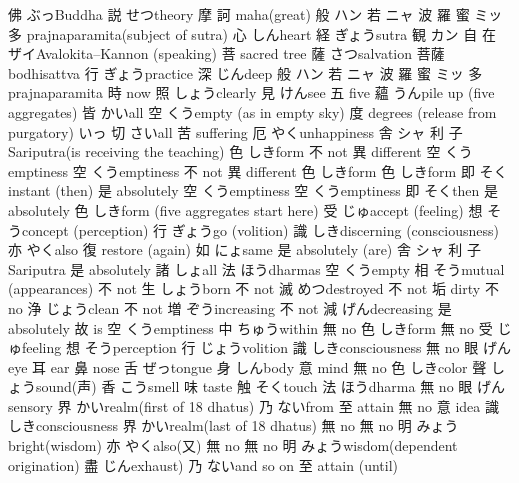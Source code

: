 	
{佛}	{ぶっ}{Buddha}
{説}	{せつ}{theory}
{摩}	{}{}
{訶}	{}{maha(great)}
{般}	{ハン}{}
{若}	{ニャ}{}
{波}	{}{}
{羅}	{}{}
{蜜}	{ミッ}{}
{多}	{}{prajnaparamita(subject of sutra)}
{心}	{しん}{heart}
{経}	{ぎょう}{sutra}
{観}	{カン}{}
{自}	{}{}
{在}	{ザイ}{Avalokita--Kannon (speaking)}
{菩}	{}{sacred tree}
{薩}	{さつ}{salvation 菩薩 bodhisattva}
{行}	{ぎょう}{practice}
{深}	{じん}{deep}
{般}	{ハン}{}
{若}	{ニャ}{}
{波}	{}{}
{羅}	{}{}
{蜜}	{ミッ}{}
{多}	{}{prajnaparamita}
{時}	{}{now}
{照}	{しょう}{clearly}
{見}	{けん}{see}
{五}	{}{five}
{蘊}	{うん}{pile up (five aggregates) }
{皆}	{かい}{all}
{空}	{くう}{empty (as in empty sky)}
{度}	{}{degrees (release from purgatory)}
{\stick}	{いっ}{}
{切}	{さい}{all}
{苦}	{}{suffering}
{厄}	{やく}{unhappiness}
{舎}	{シャ}{}
{利}	{}{}
{子}	{}{Sariputra(is receiving the teaching)}
{色}	{しき}{form}
{不}	{}{not}
{異}	{}{different}
{空}	{くう}{emptiness}
{空}	{くう}{emptiness}
{不}	{}{not}
{異}	{}{different}
{色}	{しき}{form}
{色}	{しき}{form}
{即}	{そく}{instant (then)}
{是}	{}{absolutely}
{空}	{くう}{emptiness}
{空}	{くう}{emptiness}
{即}	{そく}{then}
{是}	{}{absolutely}
{色}	{しき}{form (five aggregates start here)}
{受}	{じゅ}{accept (feeling)}
{想}	{そう}{concept (perception)}
{行}	{ぎょう}{go (volition)}
{識}	{しき}{discerning (consciousness)}
{亦}	{やく}{also}
{復}	{}{restore (again)}
{如}	{にょ}{same}
{是}	{}{absolutely (are)}
{舎}	{シャ}{}
{利}	{}{}
{子}	{}{Sariputra}
{是}	{}{absolutely}
{諸}	{しょ}{all}
{法}	{ほう}{dharmas}
{空}	{くう}{empty}
{相}	{そう}{mutual (appearances)}
{不}	{}{not}
{生}	{しょう}{born}
{不}	{}{not}
{滅}	{めつ}{destroyed}
{不}	{}{not}
{垢}	{}{dirty}
{不}	{}{no}
{浄}	{じょう}{clean}
{不}	{not}
{増}	{ぞう}{increasing}
{不}	{}{not}
{減}	{げん}{decreasing}
{是}	{}{absolutely}
{故}	{}{is}
{空}	{くう}{emptiness}
{中}	{ちゅう}{within}
{無}	{}{no}
{色}	{しき}{form}
{無}	{}{no}
{受}	{じゅ}{feeling}
{想}	{そう}{perception}
{行}	{じょう}{volition}
{識}	{しき}{consciousness}
{無}	{}{no}
{眼}	{げん}{eye}
{耳}	{}{ear}
{鼻}	{}{nose}
{舌}	{ぜっ}{tongue}
{身}	{しん}{body}
{意}	{}{mind}
{無}	{}{no}
{色}	{しき}{color}
{聲}	{しょう}{sound(声)}
{香}	{こう}{smell}
{味}	{}{taste}
{触}	{そく}{touch}
{法}	{ほう}{dharma}
{無}	{}{no}
{眼}	{げん}{sensory}
{界}	{かい}{realm(first of 18 dhatus)}
{乃}	{ない}{from}
{至}	{}{attain}
{無}	{}{no}
{意}	{}{idea}
{識}	{しき}{consciousness}
{界}	{かい}{realm(last of 18 dhatus)}
{無}	{}{no}
{無}	{}{no}
{明}	{みょう}{bright(wisdom)}
{亦}	{やく}{also(又)}
{無}	{}{no}
{無}	{}{no}
{明}	{みょう}{wisdom(dependent origination)}
{盡}	{じん}{exhaust)}
{乃}	{ない}{and so on}
{至}	{}{attain (until)}
